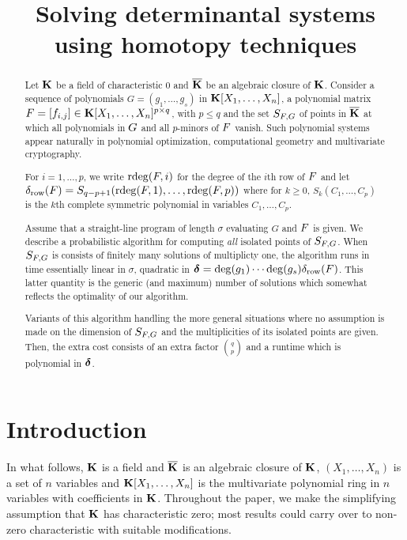 \documentclass[12pt]{article}
\title{Solving determinantal systems using homotopy techniques}
\begin{document}
\maketitle

\begin{abstract}
  Let $\mathbf{K}$ be a field of characteristic $0$ and $\overline{\mathbf{K}}$ be an
  algebraic closure of $\mathbf{K}$. Consider a sequence of polynomials
  $G=(g_1,\dots,g_s)$ in $\mathbf{K}[X_1,\dots,X_n]$, a polynomial matrix
  ${F}=[f_{i,j}] \in \mathbf{K}[X_1,\dots,X_n]^{p \times q}$, with $p \leq q$
  and the set $S_{{F}, G}$ of points in $\overline{\mathbf{K}}$ at which all
  polynomials in ${G}$ and all $p$-minors of ${F}$ vanish. Such
  polynomial systems appear naturally in polynomial optimization,
  computational geometry and multivariate cryptography.

  For $i=1,\dots,p$, we write $\mathrm{rdeg}({F},i)$ for the degree of the
  $i$th row of ${F}$ and let
  $\delta_{\rm row}({F}) = S_{q-p+1}(\mathrm{rdeg}({F},1), \ldots,
  \mathrm{rdeg}({F},p))$
  where for $k\ge 0$, $S_k(C_1,\dots,C_p)$ is the $k$th complete
  symmetric polynomial in variables $C_1,\dots,C_p$.

  Assume that a straight-line program of length $\sigma$ evaluating $G$ and
  ${F}$ is given.  We describe a probabilistic algorithm for computing
  \emph{all} isolated points of $S_{{F}, G}$. When $S_{{F}, G}$ is
  consists of finitely many solutions of multiplicty one, the
  algorithm runs in time essentially linear in $\sigma$, quadratic in
  $\mbox{\boldmath$\delta$}= \deg(g_1)\cdots \deg(g_s)\delta_{{\rm row}}({F})$.  This
  latter quantity is the generic (and maximum) number of solutions
  which somewhat reflects the optimality of our algorithm.

  Variants of this algorithm handling the more general situations
  where no assumption is made on the dimension of $S_{{F}, G}$ and the
  multiplicities of its isolated points are given. Then, the extra
  cost consists of an extra factor ${{q}\choose{p}}$ and a runtime
  which is polynomial in $\mbox{\boldmath$\delta$}$.
\end{abstract}

\section{Introduction}\label{sec:intro}

In what follows, $\mathbf{K}$ is a field and $\overline{\mathbf{K}}$ is an algebraic closure
of $\mathbf{K}$, $(X_1, \ldots, X_n)$ is a set of $n$ variables and
$\mathbf{K}[X_1,\dots,X_n]$ is the multivariate polynomial ring in $n$
variables with coefficients in $\mathbf{K}$. Throughout the paper, we 
make the simplifying assumption that $\mathbf{K}$ has characteristic zero;
 most results could carry over to non-zero characteristic
with suitable modifications.
\end{document}
